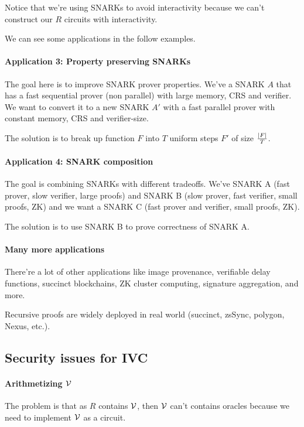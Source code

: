   Notice that we're using SNARKs to avoid interactivity because we can't construct 
  our $R$ circuits with interactivity.

  We can see some applications in the follow examples.

  \paragraph{Application 3: Property preserving SNARKs}
  The goal here is to improve SNARK prover properties.
  We've a SNARK $A$ that has a fast sequential prover (non parallel) with large memory, CRS and verifier.
  We want to convert it to a new SNARK $A'$ with a fast parallel prover with constant memory, CRS 
  and verifier-size.

  The solution is to break up function $F$ into $T$ uniform steps $F'$ of size $\frac{\left| F \right|}{T}$.

  \paragraph{Application 4: SNARK composition}
  The goal is combining SNARKs with different tradeoffs.
  We've SNARK A (fast prover, slow verifier, large proofs) and SNARK B 
  (slow prover, fast verifier, small proofs, ZK) and we want a SNARK C 
  (fast prover and verifier, small proofs, ZK).

  The solution is to use SNARK B to prove correctness of SNARK A.

  \paragraph{Many more applications}
  There're a lot of other applications like image provenance, verifiable delay 
  functions, succinct blockchains, ZK cluster computing, signature aggregation, and more.

  Recursive proofs are widely deployed in real world (succinct, zsSync, polygon,
  Nexus, etc.).

  \subsection{Security issues for IVC}
  \paragraph{Arithmetizing $\mathcal{V}$}
  The problem is that as $R$ contains $\mathcal{V}$, then $\mathcal{V}$ can't contains oracles because
  we need to implement $\mathcal{V}$ as a circuit.

